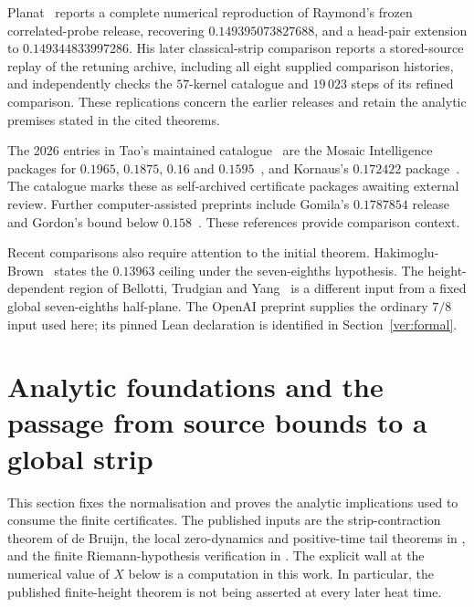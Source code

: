 \documentclass[11pt,a4paper]{article}
\theoremstyle{definition}
\theoremstyle{remark}
\begin{document}
Planat~\cite[Section~8]{PlanatCollective2026} reports a complete numerical
reproduction of Raymond's frozen correlated-probe release, recovering
$0.149395073827688$, and a head-pair extension to
$0.149344833997286$. His later classical-strip comparison
\cite[Sections~4--5]{PlanatClassical2026} reports a stored-source replay
of the retuning archive, including all eight supplied comparison
histories, and independently checks the $57$-kernel catalogue and
$19\,023$ steps of its refined comparison. These replications concern
the earlier releases and retain the analytic premises stated in the
cited theorems.

The 2026 entries in Tao's maintained catalogue~\cite{TaoCatalogue2026}
are the Mosaic Intelligence packages for $0.1965$, $0.1875$, $0.16$ and
$0.1595$~\cite{MI2026,MI2026b,MI2026c,MI2026d}, and Kornaus's
$0.172422$ package~\cite{Kornaus2026}. The catalogue marks these as
self-archived certificate packages awaiting external review. Further
computer-assisted preprints include Gomila's $0.1787854$
release~\cite{Gomila2026} and Gordon's bound below
$0.158$~\cite{Gordon2026}. These references provide comparison context.

Recent comparisons also require attention to the initial theorem.
Hakimoglu-Brown~\cite{HakimogluBrown2026} states the $0.13963$ ceiling
under the seven-eighths hypothesis. The height-dependent region of
Bellotti, Trudgian and Yang~\cite{BellottiTrudgianYang2026} is a different
input from a fixed global seven-eighths half-plane. The OpenAI preprint
\cite{OAI:The-Quasi-Riemann-Hypothesis-September-30-2026} supplies the
ordinary $7/8$ input used here; its pinned Lean declaration is identified
in Section~\ref{ver:formal}.



\section{Analytic foundations and the passage from source bounds to a global strip}
\label{fnd:section}

This section fixes the normalisation and proves the analytic implications
used to consume the finite certificates. The published inputs are the
strip-contraction theorem of de Bruijn, the local zero-dynamics and
positive-time tail theorems in \cite{Polymath}, and the finite Riemann-hypothesis
verification in \cite{PlattTrudgian}. The explicit wall at the numerical value
of $X$ below is a computation in this work. In particular, the published
finite-height theorem is not being asserted at every later heat time.
\end{document}
